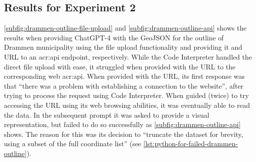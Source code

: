 \subsection{Results for Experiment 2}\label{subsec:experiment-2-results}

\autoref{subfig:drammen-outline-file-upload} and \autoref{subfig:drammen-outline-api} shows the results when providing ChatGPT-4 with the GeoJSON for the outline of Drammen municipality using the file upload functionality and providing it and URL to an \acrshort{acr:api} endpoint, respectively. While the Code Interpreter handled the direct file upload with ease, it struggled when provided with the URL to the corresponding web \acrshort{acr:api}. When provided with the URL, its first response was that \enquote{there was a problem with establishing a connection to the website}, after trying to process the request using Code Interpreter. When guided (twice) to try accessing the URL using its web browsing abilities, it was eventually able to read the data. In the subsequent prompt it was asked to provide a visual representation, but failed to do so successfully as \autoref{subfig:drammen-outline-api} shows. The reason for this was its decision to \enquote{truncate the dataset for brevity, using a subset of the full coordinate list} (see \autoref{lst:python-for-failed-drammen-outline}).

